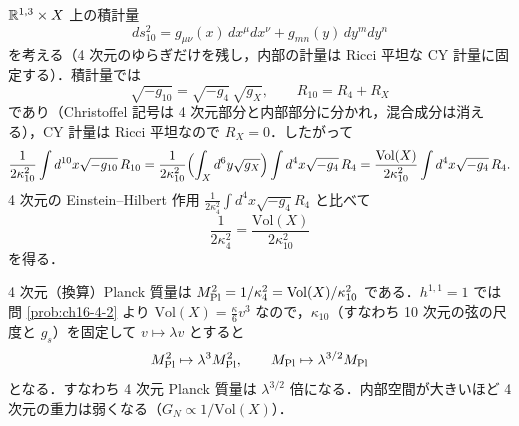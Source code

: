 $\mathbb{R}^{1,3}\times X$ 上の積計量
\[
ds_{10}^2=g_{\mu\nu}(x)\,dx^\mu dx^\nu+g_{mn}(y)\,dy^m dy^n
\]
を考える（4 次元のゆらぎだけを残し，内部の計量は Ricci 平坦な CY 計量に固定する）．積計量では
\[
\sqrt{-g_{10}}=\sqrt{-g_4}\,\sqrt{g_X},\qquad R_{10}=R_4+R_X
\]
であり（Christoffel 記号は 4 次元部分と内部部分に分かれ，混合成分は消える），CY 計量は Ricci 平坦なので $R_X=0$．したがって
\[
\frac1{2\kappa_{10}^2}\int d^{10}x\sqrt{-g_{10}}\,R_{10}
=\frac1{2\kappa_{10}^2}\Bigl(\int_Xd^6y\sqrt{g_X}\Bigr)\int d^4x\sqrt{-g_4}\,R_4
=\frac{\mathrm{Vol}(X)}{2\kappa_{10}^2}\int d^4x\sqrt{-g_4}\,R_4 .
\]
4 次元の Einstein--Hilbert 作用 $\frac1{2\kappa_4^2}\int d^4x\sqrt{-g_4}R_4$ と比べて
\[
\frac1{2\kappa_4^2}=\frac{\mathrm{Vol}(X)}{2\kappa_{10}^2}
\]
を得る．

4 次元（換算）Planck 質量は $M_{\rm Pl}^2=1/\kappa_4^2=\mathrm{Vol}(X)/\kappa_{10}^2$ である．$h^{1,1}=1$ では問 \ref{prob:ch16-4-2} より $\mathrm{Vol}(X)=\frac\kappa6v^3$ なので，$\kappa_{10}$（すなわち 10 次元の弦の尺度と $g_s$）を固定して $v\mapsto\lambda v$ とすると
\[
M_{\rm Pl}^2\mapsto\lambda^3M_{\rm Pl}^2,\qquad M_{\rm Pl}\mapsto\lambda^{3/2}M_{\rm Pl}
\]
となる．すなわち 4 次元 Planck 質量は $\lambda^{3/2}$ 倍になる．内部空間が大きいほど 4 次元の重力は弱くなる（$G_N\propto1/\mathrm{Vol}(X)$）．
